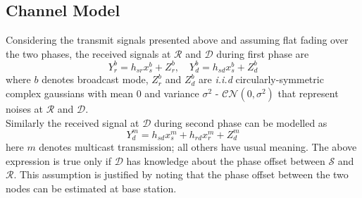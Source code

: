 \documentclass[titlepage]{article}
\begin{document}
\subsection{Channel Model}
Considering the transmit signals presented above and assuming flat fading over the two phases, the received signals at $\mathcal{R}$ and $\mathcal{D}$ during first phase are 
\begin{equation}
Y_r^b = h_{sr}x^b_s + Z_r^b , \quad Y_d^b = h_{sd}x^b_s + Z_d^b
\end{equation}
where $b$ denotes broadcast mode, $Z_r^b$ and $Z_d^b$ are \textit{i.i.d} circularly-symmetric complex gaussians with mean 0 and variance $\sigma^2$  - $\mathcal{CN}(0,\sigma^2)$ that represent noises at $\mathcal{R}$ and $\mathcal{D}$. \\
Similarly the received signal at $\mathcal{D}$ during second phase can be modelled as 
\begin{equation}
Y_d^m = h_{sd}x^m_s + h_{rd}x_r^m + Z_d^m
\end{equation}
here $m$ denotes multicast transmission; all others have usual meaning.
The above expression is true only if $\mathcal{D}$ has knowledge about the phase offset between $\mathcal{S}$ and $\mathcal{R}$. This assumption is justified by noting that the phase offset between the two nodes can be estimated at base station.
\end{document}
